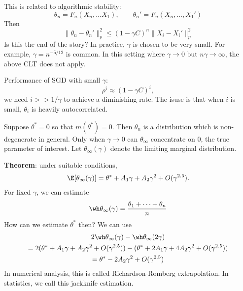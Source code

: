 This is related to algorithmic stability:
\[\theta_n = F_n(X_n, \dots X_1), \qquad \theta_n' = F_n(X_n, \dots, X_1')\]
Then
\[\|\theta_n - \theta_n'\|_p^2 \leq (1 - \gamma C)^n \|X_i - X_i'\|_p^2\]
Is this the end of the story? In practice, \(\gamma\) is chosen to be very small. For example, \(\gamma = n^{-5/12}\) is common. In this setting where \(\gamma \to 0\) but \(n \gamma \to \infty\), the above CLT does not apply.

Performance of SGD with small \(\gamma\):
\[\rho^i \approx (1 - \gamma C)^i,\]
we need \(i >> 1/\gamma\) to achieve a diminishing rate. The isuse is that when \(i\) is small, \(\theta_i\) is heavily autocorrelated.

Suppose \(\theta^* = 0\) so that \(m(\theta^*) = 0\). Then \(\theta_n\) is a distribution which is non-degenerate in general. Only when \(\gamma \to 0\) can \(\theta_\infty\) concentrate on \(0\), the true parameter of interest. Let \(\theta_\infty(\gamma)\) denote the limiting marginal distribution.

\textbf{Theorem}: under suitable conditions,
\[\E[\theta_\infty(\gamma)] = \theta^* + A_1 \gamma + A_2 \gamma^2 + O(\gamma^{2.5}).\]
For fixed \(\gamma\), we can estimate
\[\wh \theta_\infty(\gamma) = \frac{\theta_1 + \cdots + \theta_n}{n}\]
How can we estimate \(\theta^*\) then? We can use
\[\begin{gathered}2\wh\theta_\infty(\gamma) - \wh\theta_\infty(2\gamma) \\
= 2(\theta^* + A_1 \gamma + A_2 \gamma^2 + O(\gamma^{2.5})) - (\theta^* + 2A_1 \gamma + 4A_2 \gamma^2 + O(\gamma^{2.5})) \\
= \theta^* - 2A_2 \gamma^2 + O(\gamma^{2.5})\end{gathered}\]
In numerical analysis, this is called Richardson-Romberg extrapolation. In statistics, we call this jackknife estimation.

